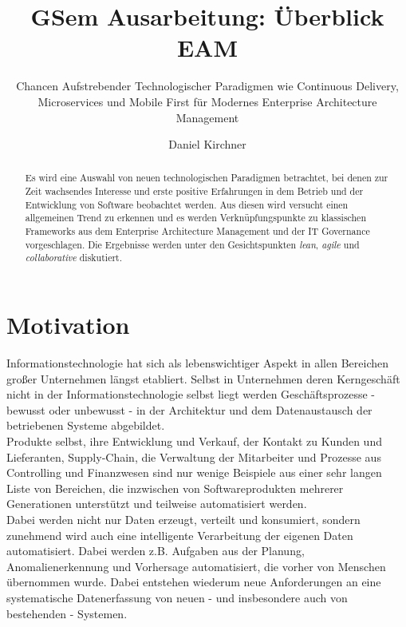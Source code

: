 \documentclass{llncs}
\begin{document}
\title{GSem Ausarbeitung: Überblick EAM}
\subtitle{Chancen Aufstrebender Technologischer Paradigmen wie Continuous Delivery, Microservices und Mobile First für Modernes Enterprise Architecture Management}
\author{Daniel Kirchner}
\maketitle
%
\begin{abstract}
Es wird eine Auswahl von neuen technologischen Paradigmen betrachtet, bei denen zur Zeit wachsendes Interesse und erste positive Erfahrungen in dem Betrieb und der Entwicklung von Software beobachtet werden.
Aus diesen wird versucht einen allgemeinen Trend zu erkennen und es werden Verknüpfungspunkte zu klassischen Frameworks aus dem Enterprise Architecture Management und der IT Governance vorgeschlagen.
Die Ergebnisse werden unter den Gesichtspunkten \textit{lean}, \textit{agile} und \textit{collaborative} diskutiert.
\end{abstract}
%
\section{Motivation}
%
Informationstechnologie hat sich als lebenswichtiger Aspekt in allen Bereichen großer Unternehmen längst etabliert. Selbst in Unternehmen deren Kerngeschäft nicht in der Informationstechnologie selbst liegt werden Geschäftsprozesse - bewusst oder unbewusst - in der Architektur und dem Datenaustausch der betriebenen Systeme abgebildet.\\

Produkte selbst, ihre Entwicklung und Verkauf, der Kontakt zu Kunden und Lieferanten, Supply-Chain, die Verwaltung der Mitarbeiter und Prozesse aus Controlling und Finanzwesen sind nur wenige Beispiele aus einer sehr langen Liste von Bereichen, die inzwischen von Softwareprodukten mehrerer Generationen unterstützt und teilweise automatisiert werden.\\

Dabei werden nicht nur Daten erzeugt, verteilt und konsumiert, sondern zunehmend wird auch eine intelligente Verarbeitung der eigenen Daten automatisiert. Dabei werden z.B. Aufgaben aus der Planung, Anomalienerkennung und Vorhersage automatisiert, die vorher von Menschen übernommen wurde. Dabei entstehen wiederum neue Anforderungen an eine systematische Datenerfassung von neuen - und insbesondere auch von bestehenden - Systemen.\\
\end{document}

